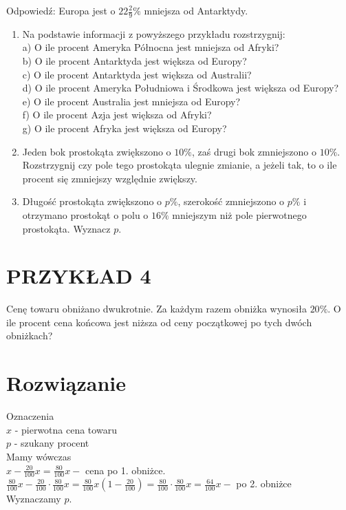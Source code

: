 \documentclass[10pt]{article}
\begin{document}
Odpowiedź: Europa jest o \(22 \frac{2}{9} \%\) mniejsza od Antarktydy.

\begin{enumerate}
  \item Na podstawie informacji z powyższego przykładu rozstrzygnij:\\
a) O ile procent Ameryka Północna jest mniejsza od Afryki?\\
b) O ile procent Antarktyda jest większa od Europy?\\
c) O ile procent Antarktyda jest większa od Australii?\\
d) O ile procent Ameryka Południowa i Środkowa jest większa od Europy?\\
e) O ile procent Australia jest mniejsza od Europy?\\
f) O ile procent Azja jest większa od Afryki?\\
g) O ile procent Afryka jest większa od Europy?
  \item Jeden bok prostokąta zwiększono o \(10 \%\), zaś drugi bok zmniejszono o \(10 \%\). Rozstrzygnij czy pole tego prostokąta ulegnie zmianie, a jeżeli tak, to o ile procent się zmniejszy względnie zwiększy.
  \item Długość prostokąta zwiększono o \(p \%\), szerokość zmniejszono o \(p \%\) i otrzymano prostokąt o polu o \(16 \%\) mniejszym niż pole pierwotnego prostokąta. Wyznacz \(p\).
\end{enumerate}

\section*{PRZYKŁAD 4}
Cenę towaru obniżano dwukrotnie. Za każdym razem obniżka wynosiła \(20 \%\). O ile procent cena końcowa jest niższa od ceny początkowej po tych dwóch obniżkach?

\section*{Rozwiązanie}
Oznaczenia\\
\(x\) - pierwotna cena towaru\\
\(p\) - szukany procent\\
Mamy wówczas\\
\(x-\frac{20}{100} x=\frac{80}{100} x-\) cena po 1. obniżce.\\
\(\frac{80}{100} x-\frac{20}{100} \cdot \frac{80}{100} x=\frac{80}{100} x\left(1-\frac{20}{100}\right)=\frac{80}{100} \cdot \frac{80}{100} x=\frac{64}{100} x-\) po 2. obniżce\\
Wyznaczamy \(p\).
\end{document}
